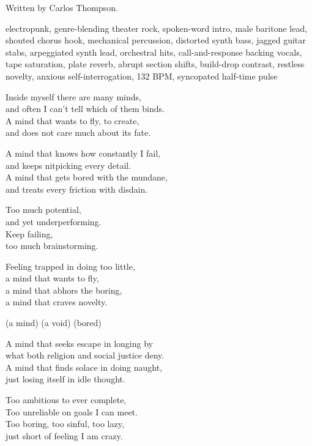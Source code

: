 
\label{sec:grinder}
\begin{notes}
Written by Carlos Thompson.
\end{notes}
\begin{style}
electropunk, genre-blending theater rock, spoken-word intro, male baritone lead, shouted chorus hook, mechanical percussion, distorted synth bass, jagged guitar stabs, arpeggiated synth lead, orchestral hits, call-and-response backing vocals, tape saturation, plate reverb, abrupt section shifts, build-drop contrast, restless novelty, anxious self-interrogation, 132 BPM, syncopated half-time pulse
\end{style}
\begin{lyrics}
Inside myself there are many minds,\\
and often I can't tell which of them binds.\\
A mind that wants to fly, to create,\\
and does not care much about its fate.

A mind that knows how constantly I fail,\\
and keeps nitpicking every detail.\\
A mind that gets bored with the mundane,\\
and treats every friction with disdain.

Too much potential,\\
and yet underperforming.\\
Keep failing,\\
too much brainstorming.

Feeling trapped in doing too little,\\
a mind that wants to fly,\\
a mind that abhors the boring,\\
a mind that craves novelty.

(a mind)
(a void)
(bored)

A mind that seeks escape in longing by\\
what both religion and social justice deny.\\
A mind that finds solace in doing naught,\\
just losing itself in idle thought.

Too ambitious to ever complete,\\
Too unreliable on goals I can meet.\\
Too boring, too sinful, too lazy,\\
just short of feeling I am crazy.


\end{lyrics}
